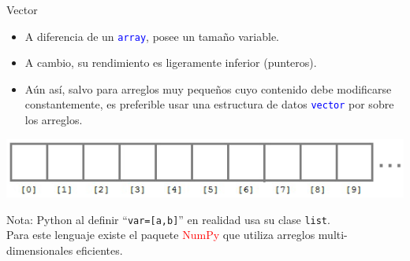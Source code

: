 \documentclass{beamer} %
\newcommand{\blue}[1]{\textcolor{blue}{#1}}
\newcommand{\red}[1]{\textcolor{red}{#1}}
\begin{document}
\begin{frame}{Vector}
    \begin{itemize}
        \item A diferencia de un \blue{\texttt{array}}, posee un tamaño variable.
        \item A cambio, su rendimiento es ligeramente inferior (punteros).\\
        \item Aún así, salvo para arreglos muy pequeños cuyo contenido debe modificarse constantemente, es preferible usar una estructura de datos \blue{\texttt{vector}} por sobre los arreglos.
    \end{itemize}
    \begin{center}
        \includegraphics[width=.8\textwidth]{./image/cap2/vector.png}
    \end{center}
    \pause
    
    {\small Nota: Python al definir ``\texttt{var=[a,b]}'' en realidad usa su clase \texttt{list}.\\
    Para este lenguaje existe el paquete \red{NumPy} que utiliza arreglos multi-dimensionales eficientes.}
\end{frame}
\end{document}
